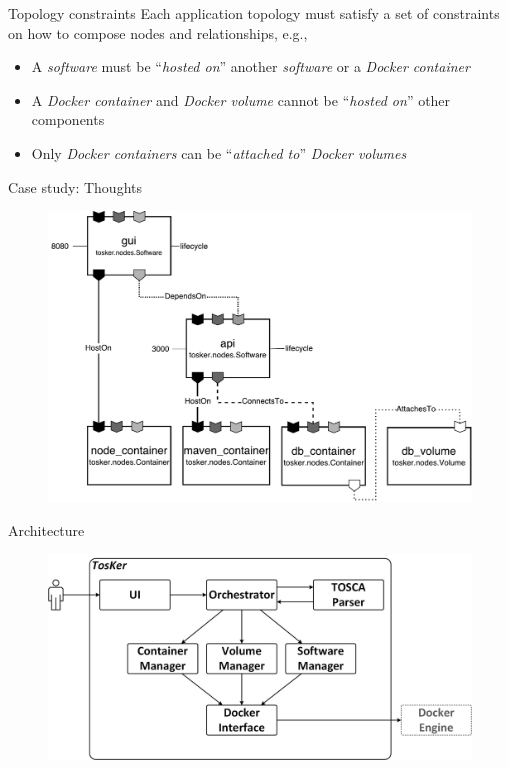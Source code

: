\documentclass{beamer}
\begin{document}
  \begin{frame}{Topology constraints}
    Each application topology must satisfy a set of constraints on how to compose nodes and relationships, e.g.,
    \begin{itemize}
      \item \small A \emph{software} must be ``\emph{hosted on}'' another \emph{software} or a \emph{Docker container}
      \item \small A \emph{Docker container} and \emph{Docker volume} cannot be ``\emph{hosted on}'' other components
      \item \small Only \emph{Docker containers} can be ``\emph{attached to}'' \emph{Docker volumes}
    \end{itemize}
  \end{frame}

  \begin{frame}{Case study: Thoughts}
    \begin{figure}
      \includegraphics[width=\textwidth]{img/thoughts_architecture.pdf}
    \end{figure}
  \end{frame}

  \begin{frame}{Architecture}
    \begin{figure}
      \includegraphics[width=\textwidth]{img/architecture.png}
    \end{figure}
  \end{frame}
\end{document}
